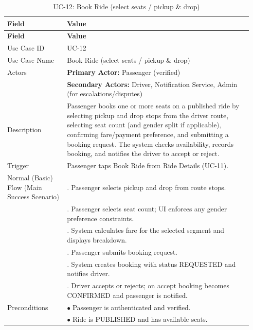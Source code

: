 \begin{longtable}{|>{\raggedright\arraybackslash}p{4cm}|>{\raggedright\arraybackslash}p{11cm}|}
\caption{UC-12: Book Ride (select seats / pickup \& drop)}
\label{tab:uc-12} \\
\hline
\rowcolor{lightgray!30}
\textbf{Field} & \textbf{Value} \\
\hline
\endfirsthead
\hline
\rowcolor{lightgray!30}
\textbf{Field} & \textbf{Value} \\
\hline
\endhead
\hline
\endfoot
\hline
\endlastfoot
Use Case ID & UC-12 \\
\hline
Use Case Name & Book Ride (select seats / pickup \& drop) \\
\hline
Actors & \textbf{Primary Actor:} Passenger (verified) \\
& \textbf{Secondary Actors:} Driver, Notification Service, Admin (for escalations/disputes) \\
\hline
Description & Passenger books one or more seats on a published ride by selecting pickup and drop stops from the driver route, selecting seat count (and gender split if applicable), confirming fare/payment preference, and submitting a booking request. The system checks availability, records booking, and notifies the driver to accept or reject. \\
\hline
Trigger & Passenger taps Book Ride from Ride Details (UC-11). \\
\hline
Normal (Basic) Flow (Main Success Scenario) & 1. Passenger selects pickup and drop from route stops. \\
& 2. Passenger selects seat count; UI enforces any gender preference constraints. \\
& 3. System calculates fare for the selected segment and displays breakdown. \\
& 4. Passenger submits booking request. \\
& 5. System creates booking with status REQUESTED and notifies driver. \\
& 6. Driver accepts or rejects; on accept booking becomes CONFIRMED and passenger is notified. \\
\hline
Preconditions & $\bullet$ Passenger is authenticated and verified. \\
& $\bullet$ Ride is PUBLISHED and has available seats. \\

\end{longtable}
